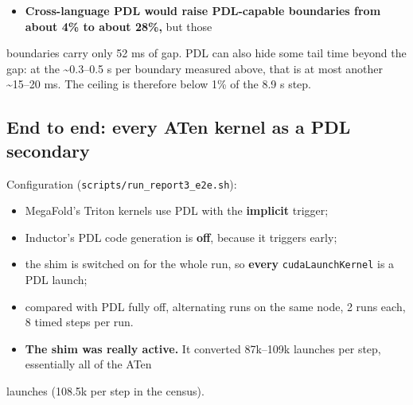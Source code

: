 \documentclass[10pt]{article}
\begin{document}
\begin{itemize}
\item \textbf{Cross-language PDL would raise PDL-capable boundaries from about 4\% to about 28\%,} but those
\end{itemize}
boundaries carry only 52 ms of gap. PDL can also hide some tail time beyond the gap: at the \textasciitilde{}0.3--0.5 \textmu{}s per boundary measured above, that is at most another \textasciitilde{}15--20 ms. The ceiling is therefore below 1\% of the 8.9 s step.


\subsection{End to end: every ATen kernel as a PDL secondary}

Configuration (\texttt{scripts/run\_report3\_e2e.sh}):


\begin{itemize}
\item MegaFold's Triton kernels use PDL with the \textbf{implicit} trigger;
\item Inductor's PDL code generation is \textbf{off}, because it triggers early;
\item the shim is switched on for the whole run, so \textbf{every} \texttt{cudaLaunchKernel} is a PDL launch;
\item compared with PDL fully off, alternating runs on the same node, 2 runs each, 8 timed steps per run.
\end{itemize}

\begin{table}[H]\centering\small
{}
\end{table}

\begin{itemize}
\item \textbf{The shim was really active.} It converted 87k--109k launches per step, essentially all of the ATen
\end{itemize}
launches (108.5k per step in the census).
\end{document}
